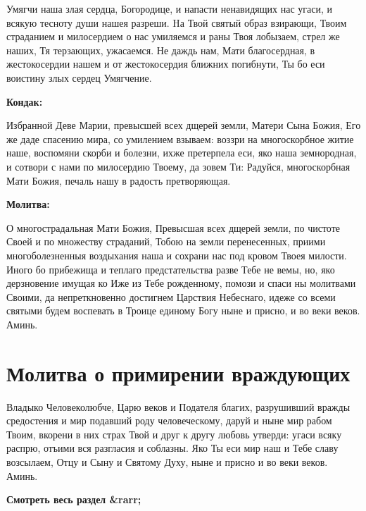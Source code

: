 Умягчи наша злая сердца, Богородице, и напасти ненавидящих нас угаси, и всякую тесноту души нашея разреши. Hа Твой святый образ взирающи, Твоим страданием и милосердием о нас умиляемся и раны Твоя лобызаем, стрел же наших, Тя терзающих, ужасаемся. Не даждь нам, Мати благосердная, в жестокосердии нашем и от жестокосердия ближних погибнути, Ты бо еси воистину злых сердец Умягчение.


\medskip


\bfseries Кондак:\normalfont{}


Избранной Деве Марии, превысшей всех дщерей земли, Матери Сына Божия, Его же даде спасению мира, со умилением взываем: воззри на многоскорбное житие наше, воспомяни скорби и болезни, ихже претерпела еси, яко наша земнородная, и сотвори с нами по милосердию Твоему, да зовем Ти: Радуйся, многоскорбная Мати Божия, печаль нашу в радость претворяющая.


\medskip


\bfseries Молитва:\normalfont{}


О многострадальная Мати Божия, Превысшая всех дщерей земли, по чистоте Своей и по множеству страданий, Тобою на земли перенесенных, приими многоболезненныя воздыхания наша и сохрани нас под кровом Твоея милости. Иного бо прибежища и теплаго предстательства разве Тебе не вемы, но, яко дерзновение имущая ко Иже из Тебе рожденному, помози и спаси ны молитвами Своими, да непреткновенно достигнем Царствия Небеснаго, идеже со всеми святыми будем воспевать в Троице единому Богу ныне и присно, и во веки веков. Аминь.


\section{Молитва о примирении враждующих}
 


Владыко Человеколюбче, Царю веков и Подателя благих, разрушивший вражды средостения и мир подавший роду человеческому, даруй и ныне мир рабом Твоим, вкорени в них страх Твой и друг к другу любовь утверди: угаси всяку распрю, отъими вся разгласия и соблазны. Яко Ты еси мир наш и Тебе славу возсылаем, Отцу и Сыну и Святому Духу, ныне и присно и во веки веков. Аминь.


\mychapterending


\bfseries Смотреть весь раздел &rarr;\normalfont{} 

